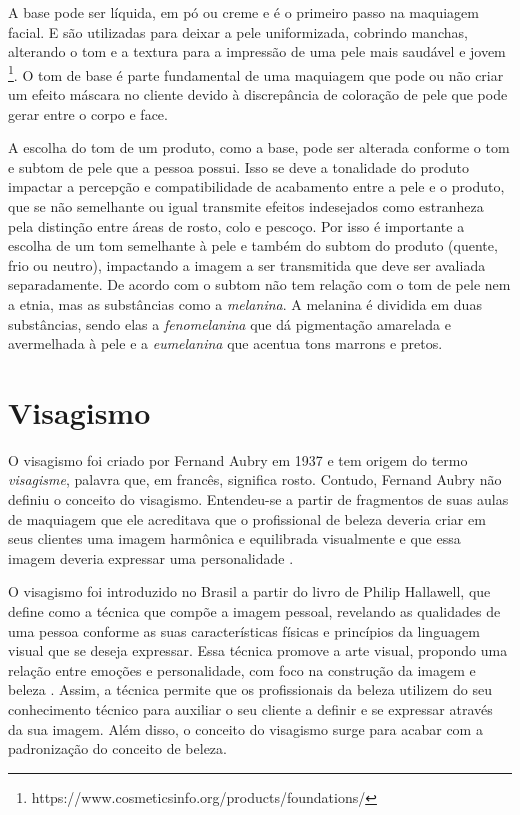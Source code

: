 A base pode ser líquida, em pó ou creme e é o primeiro passo na maquiagem facial.  E são utilizadas para deixar a pele uniformizada, cobrindo manchas, alterando o tom e a textura para a impressão de uma pele mais saudável e jovem \footnote{https://www.cosmeticsinfo.org/products/foundations/}. O tom de base é parte fundamental de uma maquiagem que pode ou não criar um efeito máscara no cliente devido à discrepância de coloração de pele que pode gerar entre o corpo e face.

A escolha do tom de um produto, como a base, pode ser alterada conforme o tom e subtom de pele que a pessoa possui. Isso se deve a tonalidade do produto impactar a percepção e compatibilidade de acabamento entre a pele e o produto, que se não semelhante ou igual transmite efeitos indesejados como estranheza pela distinção entre áreas de rosto, colo e pescoço. 
Por isso é importante a escolha de um tom semelhante à pele e também do subtom do produto (quente, frio ou neutro), impactando a imagem a ser transmitida que deve ser avaliada separadamente.
De acordo com \cite{Maquiagem_técnicas_referências_e_atuação_profissional}  o  subtom  não tem relação com o tom de pele nem a etnia, mas as substâncias como a \textit{melanina}. A melanina é dividida em duas substâncias, sendo elas a \textit{fenomelanina} que dá pigmentação amarelada e avermelhada à pele e a \textit{eumelanina} que acentua tons marrons e pretos.

\section{Visagismo}
O visagismo foi criado por Fernand Aubry em 1937 e tem origem do termo \textit{visagisme}, palavra que, em francês, significa rosto. Contudo, Fernand Aubry não definiu o conceito do visagismo. Entendeu-se a partir de fragmentos de suas aulas de maquiagem que ele acreditava que o profissional de beleza deveria criar em seus clientes uma imagem harmônica e equilibrada visualmente e que essa imagem deveria expressar uma personalidade \cite{Visagismo_Harmonia_e_Estetica}.

O visagismo foi introduzido no Brasil a partir do livro de Philip Hallawell, que define como a técnica que compõe a imagem pessoal, revelando as qualidades de uma pessoa conforme as suas características físicas e princípios da linguagem visual que se deseja expressar. Essa técnica promove a arte visual, propondo uma relação entre emoções e personalidade, com foco na construção da imagem e beleza \cite{Visagismo_Harmonia_e_Estetica}. Assim, a técnica permite que os profissionais da beleza utilizem do seu conhecimento técnico para auxiliar o seu cliente a definir e se expressar através da sua imagem. Além disso, o conceito do visagismo surge para acabar com a padronização do conceito de beleza\cite{Visagismo}. 

